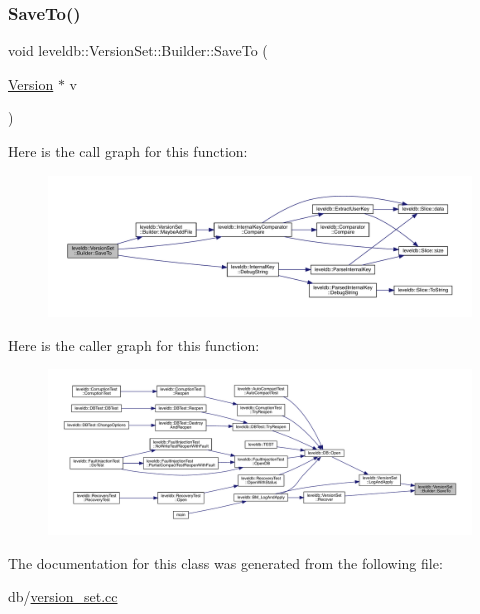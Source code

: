 \subsubsection{\texorpdfstring{SaveTo()}{SaveTo()}}
{\footnotesize\ttfamily void leveldb\+::\+Version\+Set\+::\+Builder\+::\+Save\+To (\begin{DoxyParamCaption}\item[{\mbox{\hyperlink{classleveldb_1_1_version}{Version}} $\ast$}]{v }\end{DoxyParamCaption})\hspace{0.3cm}{\ttfamily [inline]}}

Here is the call graph for this function\+:
\nopagebreak
\begin{figure}[H]
\begin{center}
\leavevmode
\includegraphics[width=350pt]{classleveldb_1_1_version_set_1_1_builder_a429b23cc022cac08ab2ba880ac5803d1_cgraph}
\end{center}
\end{figure}
Here is the caller graph for this function\+:
\nopagebreak
\begin{figure}[H]
\begin{center}
\leavevmode
\includegraphics[width=350pt]{classleveldb_1_1_version_set_1_1_builder_a429b23cc022cac08ab2ba880ac5803d1_icgraph}
\end{center}
\end{figure}


The documentation for this class was generated from the following file\+:\begin{DoxyCompactItemize}
\item 
db/\mbox{\hyperlink{version__set_8cc}{version\+\_\+set.\+cc}}\end{DoxyCompactItemize}
